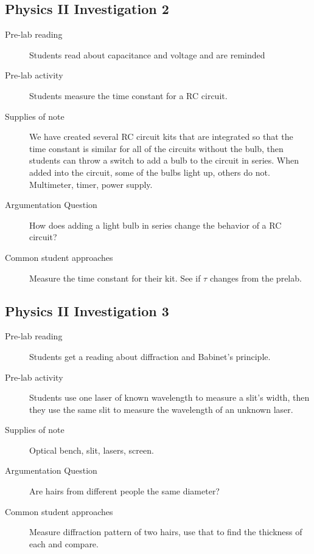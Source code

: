 \documentclass[aip, numerical, preprint]{revtex4-2}
\begin{document}
\subsection{Physics \textrm{II} Investigation 2}
\begin{description}
  \item[Pre-lab reading] Students read about capacitance and voltage and are reminded
  \item[Pre-lab activity] Students measure the time constant for a RC circuit.
  \item[Supplies of note] We have created several RC circuit kits that are integrated so that
  the time constant is similar for all of the circuits without the bulb, then students can
  throw a switch to add a bulb to the circuit in series.  When added into the circuit, some of
  the bulbs light up, others do not. Multimeter, timer, power supply.
  \item[Argumentation Question] How does adding a light bulb in series change the behavior of a
  RC circuit?
  \item[Common student approaches] Measure the time constant for their kit.  See if $\tau$
  changes from the prelab.
\end{description}

\subsection{Physics \textrm{II} Investigation 3}
\begin{description}
  \item[Pre-lab reading] Students get a reading about diffraction and Babinet's principle.
  \item[Pre-lab activity] Students use one laser of known wavelength to measure a slit's width,
  then they use the same slit to measure the wavelength of an unknown laser.
  \item[Supplies of note] Optical bench, slit, lasers, screen.
  \item[Argumentation Question] Are hairs from different people the same diameter?
  \item[Common student approaches] Measure diffraction pattern of two hairs, use that to find
  the thickness of each and compare.
\end{description}
\end{document}
